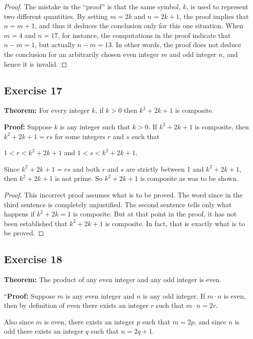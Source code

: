 \documentclass[14pt]{extarticle}
\begin{document}
\begin{proof}
    The mistake in the “proof” is that the same symbol, $k$, is used to represent two different quantities. By setting $m = 2k$ and $n = 2k + 1$, the proof implies that $n = m + 1$, and thus it deduces the conclusion only for this one situation. When $m = 4$ and $n = 17$, for instance, the computations in the proof indicate that $n - m = 1$, but actually $n - m = 13$. In other words, the proof does not deduce the conclusion for an arbitrarily chosen even integer $m$ and odd integer $n$, and hence it is invalid.
\end{proof}

\subsection{Exercise 17}
{\bf Theorem:} For every integer $k$, if $k > 0$ then $k^2 + 2k + 1$ is composite.

    {\bf Proof:} Suppose $k$ is any integer such that $k > 0$. If $k^2 + 2k + 1$ is composite, then $k^2 + 2k + 1 = rs$
for some integers $r$ and $s$ such that

$1 < r < k^2 + 2k + 1$ and $1 < s < k^2 + 2k + 1$.

Since $k^2 + 2k + 1 = rs$ and both $r$ and $s$ are strictly between 1 and $k^2 + 2k + 1$, then $k^2 + 2k + 1$ is not prime. So $k^2 + 2k + 1$ is composite as was to be shown.

\begin{proof}
    This incorrect proof assumes what is to be proved. The word since in the third sentence is completely unjustified. The second sentence tells only what happens if $k^2 + 2k = 1$ is composite. But at that point in the proof, it has not been established that $k^2 + 2k + 1$ is composite. In fact, that is exactly what is to be proved.
\end{proof}

\subsection{Exercise 18}
{\bf Theorem:} The product of any even integer and any odd integer is even.

“{\bf Proof:} Suppose $m$ is any even integer and $n$ is any odd integer. If $m\cdot n$ is even, then by definition of even there exists an integer $r$ such that $m\cdot n = 2r$.

Also since $m$ is even, there exists an integer $p$ such that $m = 2p$, and since $n$ is odd there exists an integer $q$ such that $n = 2q + 1$.
\end{document}
